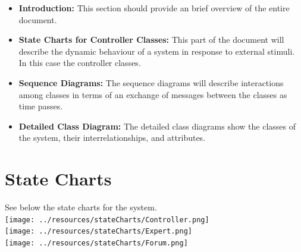 \documentclass[titlepage]{article}
\begin{document}
\begin{itemize}
	\item \textbf{Introduction:} This section should provide an brief overview of the entire document. 
	\item \textbf{State Charts for Controller Classes:} This part of the document will describe the dynamic behaviour of a system in response to external stimuli. In this case the controller classes.
	\item \textbf{Sequence Diagrams:} The sequence diagrams will describe interactions among classes in terms of an exchange of messages between the classes as time passes. 
	\item \textbf{Detailed Class Diagram:} The detailed class diagrams show the classes of the system, their interrelationships, and attributes.  
\end{itemize}


\section{State Charts}
See below the state charts for the system.\\
\texttt{[image: ../resources/stateCharts/Controller.png]}\\
\texttt{[image: ../resources/stateCharts/Expert.png]}\\
\texttt{[image: ../resources/stateCharts/Forum.png]}\\
\end{document}
